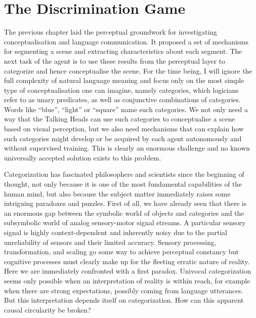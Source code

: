 \chapter{The Discrimination Game}

The previous chapter laid the perceptual groundwork 
for investigating conceptualisation and language 
communication. It proposed a set of mechanisms for segmenting a 
scene and extracting characteristics about each 
segment. The next task of the agent is to use these results
from the perceptual layer to categorize 
and hence conceptualise the
scene. For the time being, I will 
ignore the full complexity of natural
language meaning and focus only on the most 
simple type of conceptualisation one can
imagine, namely categories, which logicians refer 
to as unary predicates, as well as conjunctive 
combinations of categories. Words like ``blue'', ``light'' or
``square'' name such categories. We not only need a way 
that the Talking Heads can use such categories to conceptualise
a scene based on visual perception, but we also need 
mechanisms that can explain how such categories might 
develop or be acquired by each agent autonomously and 
without supervised training. This is clearly an enormous
challenge and no known universally accepted solution 
exists to this problem.

Categorization has fascinated philosophers and scientists
since the beginning of thought, not only because it is one
of the most fundamental capabilities of the human mind, 
but also because the subject matter immediately raises 
some intriguing paradoxes and puzzles. First of all, 
we have already seen that there is an enormous 
gap between the symbolic world of objects and categories
and the subsymbolic world of analog sensory-motor signal streams. 
A particular sensory signal is highly context-dependent and
inherently noisy due to the partial
unreliability of sensors and their limited accuracy. 
Sensory processing, transformation, and scaling 
go some way to achieve perceptual constancy
but cognitive processes must clearly make up for
the fleeting erratic nature of reality. 
Here we are immediately confronted with a first paradox. 
Univocal categorization seems only possible when 
an interpretation of reality is within reach, for example
when there are strong expectations, possibly coming 
from language utterances. But this interpretation
depends itself on categorization. How can this apparent
causal circularity be broken? 

